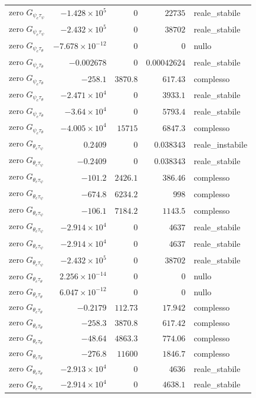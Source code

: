 \documentclass[10pt,a4paper]{article}
\numberwithin{equation}{section}
\begin{document}
\begin{longtable}{lrrrl}
zero $G_{\psi_e\tau_\psi}$ & $-1.428\times10^{5}$ & $0$ & $22735$ & reale\_stabile \\
zero $G_{\psi_e\tau_\psi}$ & $-2.432\times10^{5}$ & $0$ & $38702$ & reale\_stabile \\
\midrule
zero $G_{\psi_e\tau_\theta}$ & $-7.678\times10^{-12}$ & $0$ & $0$ & nullo \\
zero $G_{\psi_e\tau_\theta}$ & $-0.002678$ & $0$ & $0.00042624$ & reale\_stabile \\
zero $G_{\psi_e\tau_\theta}$ & $-258.1$ & $3870.8$ & $617.43$ & complesso \\
zero $G_{\psi_e\tau_\theta}$ & $-2.471\times10^{4}$ & $0$ & $3933.1$ & reale\_stabile \\
zero $G_{\psi_e\tau_\theta}$ & $-3.64\times10^{4}$ & $0$ & $5793.4$ & reale\_stabile \\
zero $G_{\psi_e\tau_\theta}$ & $-4.005\times10^{4}$ & $15715$ & $6847.3$ & complesso \\
\midrule
zero $G_{\theta_e\tau_\psi}$ & $0.2409$ & $0$ & $0.038343$ & reale\_instabile \\
zero $G_{\theta_e\tau_\psi}$ & $-0.2409$ & $0$ & $0.038343$ & reale\_stabile \\
zero $G_{\theta_e\tau_\psi}$ & $-101.2$ & $2426.1$ & $386.46$ & complesso \\
zero $G_{\theta_e\tau_\psi}$ & $-674.8$ & $6234.2$ & $998$ & complesso \\
zero $G_{\theta_e\tau_\psi}$ & $-106.1$ & $7184.2$ & $1143.5$ & complesso \\
zero $G_{\theta_e\tau_\psi}$ & $-2.914\times10^{4}$ & $0$ & $4637$ & reale\_stabile \\
zero $G_{\theta_e\tau_\psi}$ & $-2.914\times10^{4}$ & $0$ & $4637$ & reale\_stabile \\
zero $G_{\theta_e\tau_\psi}$ & $-2.432\times10^{5}$ & $0$ & $38702$ & reale\_stabile \\
\midrule
zero $G_{\theta_e\tau_\theta}$ & $2.256\times10^{-14}$ & $0$ & $0$ & nullo \\
zero $G_{\theta_e\tau_\theta}$ & $6.047\times10^{-12}$ & $0$ & $0$ & nullo \\
zero $G_{\theta_e\tau_\theta}$ & $-0.2179$ & $112.73$ & $17.942$ & complesso \\
zero $G_{\theta_e\tau_\theta}$ & $-258.3$ & $3870.8$ & $617.42$ & complesso \\
zero $G_{\theta_e\tau_\theta}$ & $-48.64$ & $4863.3$ & $774.06$ & complesso \\
zero $G_{\theta_e\tau_\theta}$ & $-276.8$ & $11600$ & $1846.7$ & complesso \\
zero $G_{\theta_e\tau_\theta}$ & $-2.913\times10^{4}$ & $0$ & $4636$ & reale\_stabile \\
zero $G_{\theta_e\tau_\theta}$ & $-2.914\times10^{4}$ & $0$ & $4638.1$ & reale\_stabile \\
\bottomrule\end{longtable}
\end{document}
